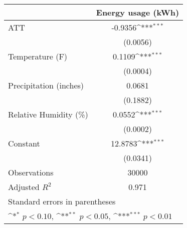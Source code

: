 {
\def\sym#1{\ifmmode^{#1}\else\(^{#1}\)\fi}
\begin{tabular}{l*{1}{c}}
\hline\hline
                    &\multicolumn{1}{c}{Energy usage (kWh)}\\
\hline
ATT                 &     -0.9356\sym{***}\\
                    &    (0.0056)         \\
[1em]
Temperature (F)     &      0.1109\sym{***}\\
                    &    (0.0004)         \\
[1em]
Precipitation (inches)&      0.0681         \\
                    &    (0.1882)         \\
[1em]
Relative Humidity (\%)&      0.0552\sym{***}\\
                    &    (0.0002)         \\
[1em]
Constant            &     12.8783\sym{***}\\
                    &    (0.0341)         \\
\hline
Observations        &       30000         \\
Adjusted \(R^{2}\)  &       0.971         \\
\hline\hline
\multicolumn{2}{l}{\footnotesize Standard errors in parentheses}\\
\multicolumn{2}{l}{\footnotesize \sym{*} \(p<0.10\), \sym{**} \(p<0.05\), \sym{***} \(p<0.01\)}\\
\end{tabular}
}
